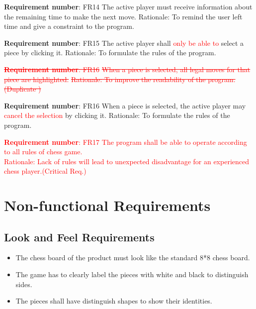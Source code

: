 \documentclass[12pt, titlepage]{article}
\begin{document}
\begin{enumerate}
\item \textbf{Requirement number}: FR14\newline
The active player must receive information about the remaining time to make the next move.\newline
Rationale: To remind the user left time and give a constraint to the program.
\item \textbf{Requirement number}: FR15\newline
The active player shall \textcolor{red}{only be able to} select a piece by clicking it. \newline
Rationale: To formulate the rules of the program.
\item 
\textcolor{red}{
\sout{\textbf{Requirement number}: FR16}\newline
\sout{When a piece is selected, all legal moves for that piece are highlighted.} \newline
\sout{Rationale: To improve the readability of the program. (Duplicate	)}}
\item \textbf{Requirement number}: FR16\newline
When a piece is selected, the active player may  \textcolor{red}{cancel the selection} by clicking it. \newline
Rationale: To formulate the rules of the program.
\textcolor{red}{
\item \textbf{Requirement number}: FR17\newline
The program shall be able to operate according to all rules of chess game.\\
Rationale: Lack of rules will lead to unexpected disadvantage for an experienced chess player.(Critical Req.)}
\end{enumerate}


\section{Non-functional Requirements}

\subsection{Look and Feel Requirements}
\begin{itemize}
\item The chess board of the product must look like the standard 8*8 chess board.
\item The game has to clearly label the pieces with white and black to distinguish sides.
\item The pieces shall have distinguish shapes to show their identities.
\end{itemize}
\end{document}
